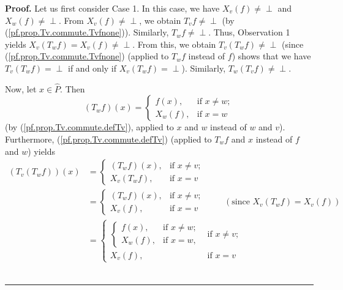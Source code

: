 \documentclass[numbers=enddot,12pt,final,onecolumn,notitlepage]{scrartcl}%
\theoremstyle{definition}
\newenvironment{verlong}{}{}
\newcommand{\undf}{\operatorname*{\bot}}
\newenvironment{proof}[1][Proof]{\noindent\textbf{#1.} }{\ \rule{0.5em}{0.5em}}
\begin{document}
\begin{verlong}
\begin{proof}
Let us first consider Case 1. In this case, we have $X_{v}\left(  f\right)
\neq\undf$ and $X_{w}\left(  f\right)  \neq\undf$. From $X_{v}\left(
f\right)  \neq\undf$, we obtain $T_{v}f\neq\undf$ (by
(\ref{pf.prop.Tv.commute.Tvfnone})). Similarly, $T_{w}f\neq\undf$. Thus,
Observation 1 yields $X_{v}\left(  T_{w}f\right)  =X_{v}\left(  f\right)
\neq\undf$. From this, we obtain $T_{v}\left(  T_{w}f\right)  \neq\undf$
(since (\ref{pf.prop.Tv.commute.Tvfnone}) (applied to $T_{w}f$ instead of $f$)
shows that we have $T_{v}\left(  T_{w}f\right)  =\undf$ if and only if
$X_{v}\left(  T_{w}f\right)  =\undf$). Similarly, $T_{w}\left(  T_{v}f\right)
\neq\undf$.

Now, let $x\in\widehat{P}$. Then%
\begin{equation}
\left(  T_{w}f\right)  \left(  x\right)  =%
\begin{cases}
f\left(  x\right)  , & \text{if }x\neq w;\\
X_{w}\left(  f\right)  , & \text{if }x=w
\end{cases}
\label{pf.prop.Tv.commute.c1.1}%
\end{equation}
(by (\ref{pf.prop.Tv.commute.defTv}), applied to $x$ and $w$ instead of $w$
and $v$). Furthermore, (\ref{pf.prop.Tv.commute.defTv}) (applied to $T_{w}f$
and $x$ instead of $f$ and $w$) yields%
\begin{align}
\left(  T_{v}\left(  T_{w}f\right)  \right)  \left(  x\right)   &  =%
\begin{cases}
\left(  T_{w}f\right)  \left(  x\right)  , & \text{if }x\neq v;\\
X_{v}\left(  T_{w}f\right)  , & \text{if }x=v
\end{cases}
\nonumber\\
&  =%
\begin{cases}
\left(  T_{w}f\right)  \left(  x\right)  , & \text{if }x\neq v;\\
X_{v}\left(  f\right)  , & \text{if }x=v
\end{cases}
\ \ \ \ \ \ \ \ \ \ \left(  \text{since }X_{v}\left(  T_{w}f\right)
=X_{v}\left(  f\right)  \right) \nonumber\\
&  =%
\begin{cases}%
\begin{cases}
f\left(  x\right)  , & \text{if }x\neq w;\\
X_{w}\left(  f\right)  , & \text{if }x=w,
\end{cases}
& \text{if }x\neq v;\\
X_{v}\left(  f\right)  , & \text{if }x=v
\end{cases}

\end{align}
\end{proof}
\end{verlong}
\end{document}
